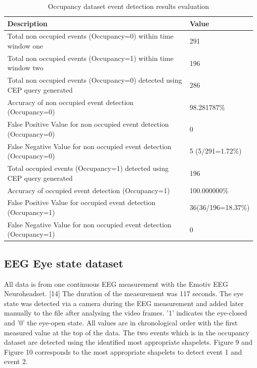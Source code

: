 \documentclass[letterpaper, 10 pt, conference]{IEEEtran}  %
\begin{document}
\begin{table}
\begin{center}
\caption{Occupancy dataset event detection results evaluation}
\begin{tabular}{ | m{6cm} | m{2.3cm}| } 
 \hline 
\textbf{Description} & \textbf{Value}\\
\hline
Total non occupied events (Occupancy=0) within time window one & 291\\
\hline
Total non occupied events (Occupancy=1) within time window two & 196 \\
\hline
Total non occupied events (Occupancy=0) detected using CEP query generated & 286\\
\hline
Accuracy of non occupied event detection (Occupancy=0) & 98.281787\%\\
\hline
False Positive Value for non occupied event detection (Occupancy=0) & 0\\
\hline
False Negative Value for non occupied event detection (Occupancy=0) & 5 \newline(5/291=1.72\%)\\
\hline
Total occupied events (Occupancy=1) detected using CEP query generated & 196\\ 
 \hline
Accuracy of occupied event detection (Occupancy=1) & 100.000000\%\\
\hline
False Positive Value for occupied event detection (Occupancy=1) & 36\newline(36/196=18.37\%)\\
\hline
False Negative Value for non occupied event detection (Occupancy=1) & 0\\
\hline

\end{tabular}
\end{center}
\end{table}

\subsection{EEG Eye state dataset}
All data is from one continuous EEG measurement with the Emotiv EEG Neuroheadset. [14] The duration of the measurement was 117 seconds. The eye state was detected via a camera during the EEG measurement and added later manually to the file after analysing the video frames. '1' indicates the eye-closed and '0' the eye-open state. All values are in chronological order with the first measured value at the top of the data. The two events which is in the occupancy dataset are detected using the identified most appropriate shapelets. Figure 9 and Figure 10 corresponds to the most appropriate shapelets to detect event 1 and event 2.
\end{document}
